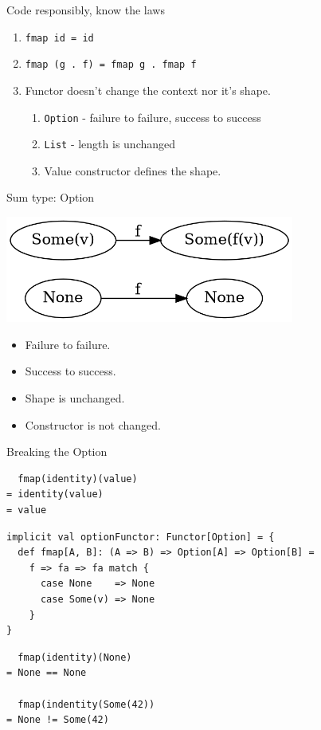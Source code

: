 \documentclass[presentation,aspectratio=169,smaller]{beamer}
\begin{document}
\begin{frame}[label={sec:org1d7f676},fragile]{Code responsibly, know the laws}
 \begin{enumerate}
\item <1-> \texttt{fmap id = id}
\item <2-> \texttt{fmap (g . f) = fmap g . fmap f}
\item <3-> Functor doesn't change the context nor it's shape.
\begin{enumerate}
\item \texttt{Option} - failure to failure, success to success
\item \texttt{List} - length is unchanged
\item Value constructor defines the shape.
\end{enumerate}
\end{enumerate}
\end{frame}

\begin{frame}[label={sec:org475f70c}]{Sum type: Option}
\begin{center}
\includegraphics[height=3.5cm]{.dot/functor-option.png}
\end{center}

\begin{itemize}
\item Failure to failure.
\item Success to success.
\item Shape is unchanged.
\item Constructor is not changed.
\end{itemize}
\end{frame}

\begin{frame}[label={sec:org36d3e10},fragile]{Breaking the Option}
 \begin{verbatim}
  fmap(identity)(value)
= identity(value)
= value
\end{verbatim}

\pause

\begin{verbatim}
implicit val optionFunctor: Functor[Option] = {
  def fmap[A, B]: (A => B) => Option[A] => Option[B] =
    f => fa => fa match {
      case None    => None
      case Some(v) => None
    }
}
\end{verbatim}

\pause

\begin{verbatim}
  fmap(identity)(None)
= None == None

  fmap(indentity(Some(42))
= None != Some(42)
\end{verbatim}
\end{frame}
\end{document}
